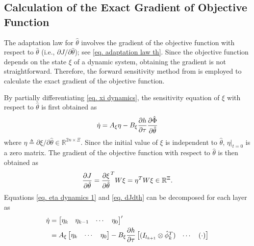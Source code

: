 \documentclass[lettersize,journal]{IEEEtran}
\begin{document}
\subsection{Calculation of the Exact Gradient of Objective Function}

The adaptation law for $\hat\theta$ involves the gradient of the objective function with respect to $\hat\theta$ (i.e., ${\partial J/\partial \hat\theta}$); see \eqref{eq. adaptation law th}. Since the objective function depends on the state $\xi$ of a dynamic system, obtaining the gradient is not straightforward. Therefore, the forward sensitivity method from \cite{RN12} is employed to calculate the exact gradient of the objective function. 

By partially differentiating \eqref{eq. xi dynamics}, the sensitivity equation of $\xi$ with respect to $\hat\theta$ is first obtained as
\begin{equation}
    \dot\eta = A_\xi\eta - B_\xi{\partial h\over\partial \tau}{\partial\hat\Phi\over\partial\hat\theta}
    \label{eq. eta dynamics 1}
\end{equation}
where $\eta \triangleq \partial \xi/\partial \hat\theta\in\mathbb R^{2n\times \Xi}$.
Since the initial value of $\xi$ is independent to $\hat\theta$, $\eta|_{t=0}$ is a zero matrix. The gradient of the objective function with respect to $\hat\theta$ is then obtained as 
\begin{equation}
   {\partial J\over\partial \hat\theta} =  {\partial \xi\over \partial \hat\theta}^T  W\xi=\eta^T  W\xi\in\mathbb{R}^\Xi.
   \label{eq. dJdth}
\end{equation}
Equations \eqref{eq. eta dynamics 1} and \eqref{eq. dJdth} can be decomposed for each layer as 
\begin{equation}
    \begin{aligned}
        \dot \eta&= 
        \begin{bmatrix}
            \eta_k&
            \eta_{k-1}&
            \cdots &
            \eta_0
        \end{bmatrix}'
        \\
        &=A_\xi
        \begin{bmatrix}
            \eta_k&
            \cdots &
            \eta_0
        \end{bmatrix}
        -B_\xi{\partial h\over\partial \tau}
        \begin{bmatrix}
            (I_{l_{k+1}}\otimes \hat\phi_{k}^T  )&
        \cdots&
        (\cdot)
        \end{bmatrix}
    \end{aligned}
    \label{eq. eta dynamics}
\end{equation}
\end{document}
